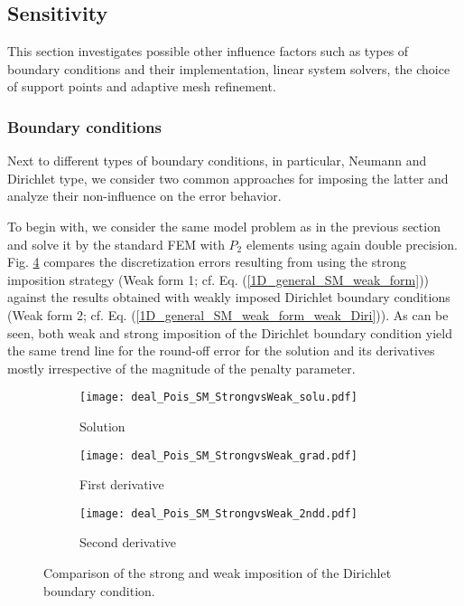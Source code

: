 \documentclass[final,3p]{elsarticle}
\begin{document}
\subsection{Sensitivity}		\label{section_sensitivity}

This section investigates possible other influence factors such as types of boundary conditions and their implementation, linear system solvers, the choice of support points and adaptive mesh refinement.

\subsubsection{Boundary conditions}	\label{Influence BC}

Next to different types of boundary conditions, in particular, Neumann and Dirichlet type, we consider two common approaches for imposing the latter and analyze their non-influence on the error behavior.

To begin with, we consider the same model problem as in the previous section and solve it by the standard FEM with $P_2$ elements using again double precision. Fig. \ref{Pois_SM_StrongvsWeak_BC_python} compares the discretization errors resulting from using the strong imposition strategy (Weak form 1; cf. Eq. (\ref{1D_general_SM_weak_form})) against the results obtained with weakly imposed Dirichlet boundary conditions (Weak form 2; cf. Eq. (\ref{1D_general_SM_weak_form_weak_Diri})).
As can be seen, both weak and strong imposition of the Dirichlet boundary condition yield the same trend line for the round-off error for the solution and its derivatives mostly irrespective of the magnitude of the penalty parameter.


\begin{figure}[!ht]
    \begin{subfigure}{5.5cm}
        \texttt{[image: deal\_Pois\_SM\_StrongvsWeak\_solu.pdf]}
        \caption{Solution}
        \label{Fig:Pois_SM_StrongvsWeak_BC_solu_python}
    \end{subfigure}
    \begin{subfigure}{5.5cm}
        \texttt{[image: deal\_Pois\_SM\_StrongvsWeak\_grad.pdf]}
        \caption{First derivative}
        \label{Fig:Pois_SM_StrongvsWeak_BC_grad_python}
    \end{subfigure}
    \begin{subfigure}{5.5cm}
        \texttt{[image: deal\_Pois\_SM\_StrongvsWeak\_2ndd.pdf]}
        \caption{Second derivative}
        \label{Fig:Pois_SM_StrongvsWeak_BC_2ndd_python}
    \end{subfigure}
\caption{Comparison of the strong and weak imposition of the Dirichlet boundary condition.}
\label{Pois_SM_StrongvsWeak_BC_python}
\end{figure}
\end{document}
